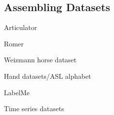 
\subsection{Assembling Datasets}
\bitem
\item Articulator
\item Romer
\item Weizmann horse dataset
\item Hand datasets/ASL alphabet
\item LabelMe
\item Time series datasets
\eitem

